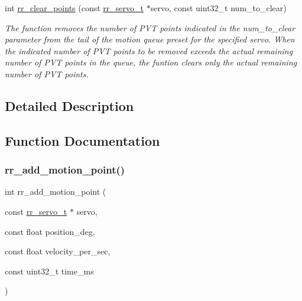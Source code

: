 \begin{DoxyCompactItemize}
int \hyperlink{group___servo__control_ga5a39de7fa2777073bbc4d9fc60fa5c38}{rr\+\_\+clear\+\_\+points} (const \hyperlink{structrr__servo__t}{rr\+\_\+servo\+\_\+t} $\ast$servo, const uint32\+\_\+t num\+\_\+to\+\_\+clear)
\begin{DoxyCompactList}\small\item\em The function removes the number of P\+VT points indicated in the \textquotesingle{}num\+\_\+to\+\_\+clear\textquotesingle{} parameter from the tail of the motion queue preset for the specified servo. When the indicated number of P\+VT points to be removed exceeds the actual remaining number of P\+VT points in the queue, the funtion clears only the actual remaining number of P\+VT points. \end{DoxyCompactList}\end{DoxyCompactItemize}


\subsection{Detailed Description}


\subsection{Function Documentation}
\mbox{\label{group___servo__control_gac8f66751d1047a4d067e3ff5b388a7f9}} 
\subsubsection{\texorpdfstring{rr\+\_\+add\+\_\+motion\+\_\+point()}{rr\_add\_motion\_point()}}
{\footnotesize\ttfamily int rr\+\_\+add\+\_\+motion\+\_\+point (\begin{DoxyParamCaption}\item[{const \hyperlink{structrr__servo__t}{rr\+\_\+servo\+\_\+t} $\ast$}]{servo,  }\item[{const float}]{position\+\_\+deg,  }\item[{const float}]{velocity\+\_\+per\+\_\+sec,  }\item[{const uint32\+\_\+t}]{time\+\_\+ms }\end{DoxyParamCaption})}



